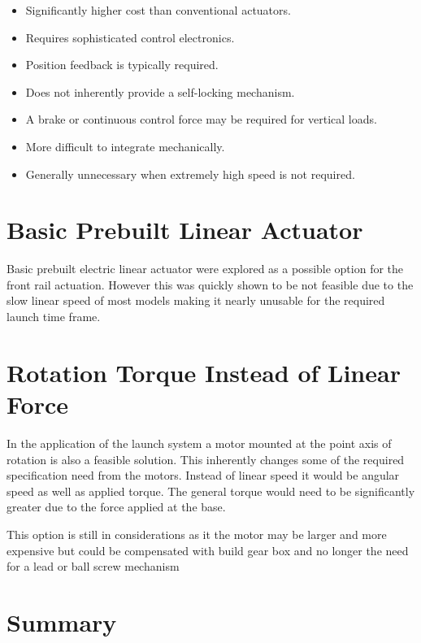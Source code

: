 \documentclass{article}
\begin{document}
\begin{itemize}
    \item Significantly higher cost than conventional actuators.
    \item Requires sophisticated control electronics.
    \item Position feedback is typically required.
    \item Does not inherently provide a self-locking mechanism.
    \item A brake or continuous control force may be required for vertical
    loads.
    \item More difficult to integrate mechanically.
    \item Generally unnecessary when extremely high speed is not required.
\end{itemize}

\section{Basic Prebuilt Linear Actuator}

Basic prebuilt electric linear actuator were explored as a possible 
option for the front rail actuation. However this was quickly shown 
to be not feasible due to the slow linear speed of most models making it 
nearly unusable for the required launch time frame. 

\section{Rotation Torque Instead of Linear Force}

In the application of the launch system a motor mounted at the point axis 
of rotation is also a feasible solution. This inherently changes some of the 
required specification need from the motors. Instead of linear speed it would be 
angular speed as well as applied torque. The general torque would need to be significantly 
greater due to the force applied at the base. 

This option is still in considerations as it the motor may be larger and more expensive 
but could be compensated with build gear box and no longer the need for a lead or ball screw 
mechanism


\section{Summary}
\end{document}
